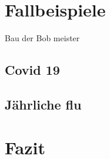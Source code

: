 \documentclass[12pt]{scrartcl} %
\begin{document}








\section{Fallbeispiele}

Bau der Bob meister


\subsection{Covid 19}


\subsection{Jährliche flu}


\newpage
\section{Fazit}


\newpage
\setlength{\bibitemsep}{\baselineskip}
\printbibliography[heading=bibintoc]
\thispagestyle{empty}
\listoffigures
\end{document}
